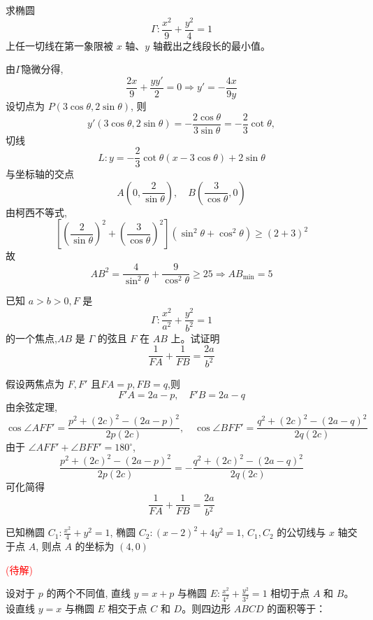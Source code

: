 \begin{questions}
    \question 求椭圆 
    \[
    \Gamma: \frac{x^2}{9} + \frac{y^2}{4} = 1
    \] 
    上任一切线在第一象限被 $x$ 轴、$y$ 轴截出之线段长的最小值。
    \begin{solution}
        由$\Gamma$隐微分得,
        \[
        \frac{2x}{9}+\frac{yy'}{2}=0 \Rightarrow y'=-\frac{4x}{9y}
        \]
        设切点为 $P(3\cos\theta,2\sin\theta)$, 则 
        \[
        y'(3\cos\theta,2\sin\theta)=-\frac{2\cos\theta}{3\sin\theta}=-\frac{2}{3}\cot\theta,
        \]
        切线 
        \[
        L: y=-\frac{2}{3}\cot\theta(x-3\cos\theta)+2\sin\theta
        \] 
        与坐标轴的交点
        \[
        A\left(0,\frac{2}{\sin\theta}\right), \quad B\left(\frac{3}{\cos\theta},0\right)
        \]
        由柯西不等式,
        \[
        \left[\left(\frac{2}{\sin\theta}\right)^2+\left(\frac{3}{\cos\theta}\right)^2\right](\sin^2\theta+\cos^2\theta) \ge (2+3)^2
        \]
        故
        \[
        AB^2 = \frac{4}{\sin^2\theta} + \frac{9}{\cos^2\theta} \ge 25 \Rightarrow AB_{\min}=5
        \]
    \end{solution}

    \question 已知 $a>b>0,F$ 是 
    \[
    \Gamma:\frac{x^2}{a^2}+\frac{y^2}{b^2}=1
    \] 
    的一个焦点,$AB$ 是 $\Gamma$ 的弦且 $F$ 在 $AB$ 上。试证明
    \[
    \frac{1}{FA}+\frac{1}{FB}=\frac{2a}{b^2}
    \]
    \begin{solution}
        假设两焦点为 $F,F'$ 且$FA=p, FB=q$,则
        \[
        F'A=2a-p,\quad F'B=2a-q
        \]
        由余弦定理,
        \[
        \cos \angle AFF' = \frac{p^2+(2c)^2-(2a-p)^2}{2p(2c)}, \quad
        \cos \angle BFF' = \frac{q^2+(2c)^2-(2a-q)^2}{2q(2c)}
        \]
        由于 $\angle AFF' + \angle BFF' = 180^\circ$,
        \[
        \frac{p^2+(2c)^2-(2a-p)^2}{2p(2c)}
        = -\frac{q^2+(2c)^2-(2a-q)^2}{2q(2c)}
        \]
        可化简得
        \[
        \frac{1}{FA}+\frac{1}{FB}=\frac{2a}{b^2}
        \]
    \end{solution}

    \question 已知椭圆 $C_1: \frac{x^2}{4} + y^2 = 1$, 椭圆 $C_2: (x-2)^2 + 4y^2 = 1$, $C_1, C_2$ 的公切线与 $x$ 轴交于点 $A$, 则点 $A$ 的坐标为 $(4,0)$
    \begin{solution}
        \textcolor{red}{(待解)}
    \end{solution}

    \question
设对于 $p$ 的两个不同值, 直线 $y = x + p$ 与椭圆 $E: \frac{x^2}{4^2} + \frac{y^2}{3^2} = 1$ 相切于点 $A$ 和 $B$。设直线 $y = x$ 与椭圆 $E$ 相交于点 $C$ 和 $D$。则四边形 $ABCD$ 的面积等于：


\end{questions}
